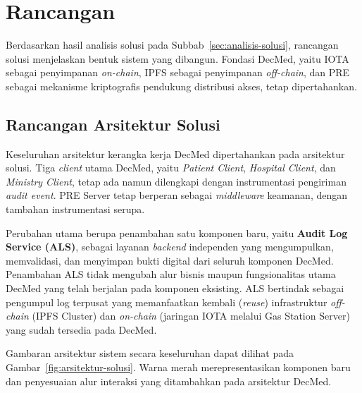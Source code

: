 %

\section{Rancangan}

Berdasarkan hasil analisis solusi pada Subbab~\ref{sec:analisis-solusi}, rancangan solusi menjelaskan bentuk sistem yang dibangun. Fondasi DecMed, yaitu IOTA sebagai penyimpanan \textit{on-chain}, IPFS sebagai penyimpanan \textit{off-chain}, dan PRE sebagai mekanisme kriptografis pendukung distribusi akses, tetap dipertahankan.

\subsection{Rancangan Arsitektur Solusi}
\label{subsec:rancangan-arsitektur}

Keseluruhan arsitektur kerangka kerja DecMed dipertahankan pada arsitektur solusi. Tiga \textit{client} utama DecMed, yaitu \textit{Patient Client}, \textit{Hospital Client}, dan \textit{Ministry Client}, tetap ada namun dilengkapi dengan instrumentasi pengiriman \textit{audit event}. PRE Server tetap berperan sebagai \textit{middleware} keamanan, dengan tambahan instrumentasi serupa.

Perubahan utama berupa penambahan satu komponen baru, yaitu \textbf{Audit Log Service (ALS)}, sebagai layanan \textit{backend} independen yang mengumpulkan, memvalidasi, dan menyimpan bukti digital dari seluruh komponen DecMed. Penambahan ALS tidak mengubah alur bisnis maupun fungsionalitas utama DecMed yang telah berjalan pada komponen eksisting. ALS bertindak sebagai pengumpul log terpusat yang memanfaatkan kembali (\textit{reuse}) infrastruktur \textit{off-chain} (IPFS Cluster) dan \textit{on-chain} (jaringan IOTA melalui Gas Station Server) yang sudah tersedia pada DecMed.

Gambaran arsitektur sistem secara keseluruhan dapat dilihat pada Gambar~\ref{fig:arsitektur-solusi}. Warna merah merepresentasikan komponen baru dan penyesuaian alur interaksi yang ditambahkan pada arsitektur DecMed.

